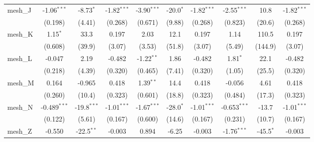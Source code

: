 \begin{tabular}{lccccccccc}
   mesh\_J                                                     & -1.06$^{***}$  & -8.73$^{*}$    & -1.82$^{***}$ & -3.90$^{***}$ & -20.0$^{*}$    & -1.82$^{***}$ & -2.55$^{***}$  & 10.8          & -1.82$^{***}$\\   
                                                               & (0.198)        & (4.41)         & (0.268)       & (0.671)       & (9.88)         & (0.268)       & (0.823)        & (20.6)        & (0.268)\\   
   mesh\_K                                                     & 1.15$^{*}$     & 33.3           & 0.197         & 2.03          & 12.1           & 0.197         & 1.14           & 110.5         & 0.197\\   
                                                               & (0.608)        & (39.9)         & (3.07)        & (3.53)        & (51.8)         & (3.07)        & (5.49)         & (144.9)       & (3.07)\\   
   mesh\_L                                                     & -0.047         & 2.19           & -0.482        & -1.22$^{**}$  & 1.86           & -0.482        & 1.81$^{*}$     & 22.1          & -0.482\\   
                                                               & (0.218)        & (4.39)         & (0.320)       & (0.465)       & (7.41)         & (0.320)       & (1.05)         & (25.5)        & (0.320)\\   
   mesh\_M                                                     & 0.164          & -0.965         & 0.418         & 1.39$^{**}$   & 14.4           & 0.418         & -0.056         & 4.61          & 0.418\\   
                                                               & (0.260)        & (10.4)         & (0.323)       & (0.601)       & (18.8)         & (0.323)       & (0.484)        & (17.3)        & (0.323)\\   
   mesh\_N                                                     & -0.489$^{***}$ & -19.8$^{***}$  & -1.01$^{***}$ & -1.67$^{***}$ & -28.0$^{*}$    & -1.01$^{***}$ & -0.653$^{***}$ & -13.7         & -1.01$^{***}$\\   
                                                               & (0.122)        & (5.61)         & (0.167)       & (0.600)       & (14.6)         & (0.167)       & (0.231)        & (10.7)        & (0.167)\\   
   mesh\_Z                                                     & -0.550         & -22.5$^{**}$   & -0.003        & 0.894         & -6.25          & -0.003        & -1.76$^{***}$  & -45.5$^{*}$   & -0.003\\   

\end{tabular}
